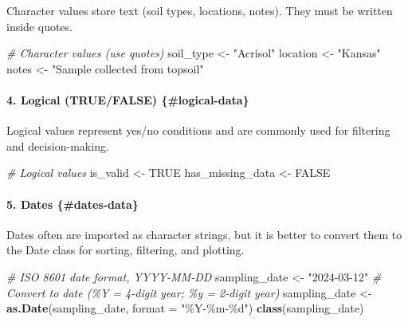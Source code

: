 \documentclass[
  10pt,
  b5paper,
  oneside]{book}
\newenvironment{Shaded}{\begin{snugshade}}{\end{snugshade}}
\newcommand{\AttributeTok}[1]{\textcolor[rgb]{0.13,0.29,0.53}{#1}}
\newcommand{\CommentTok}[1]{\textcolor[rgb]{0.56,0.35,0.01}{\textit{#1}}}
\newcommand{\ConstantTok}[1]{\textcolor[rgb]{0.56,0.35,0.01}{#1}}
\newcommand{\FunctionTok}[1]{\textcolor[rgb]{0.13,0.29,0.53}{\textbf{#1}}}
\newcommand{\NormalTok}[1]{#1}
\newcommand{\OtherTok}[1]{\textcolor[rgb]{0.56,0.35,0.01}{#1}}
\newcommand{\StringTok}[1]{\textcolor[rgb]{0.31,0.60,0.02}{#1}}
\begin{document}
Character values store text (soil types, locations, notes). They must be written inside quotes.

\begin{Shaded}
\begin{Highlighting}[]
\CommentTok{\# Character values (use quotes)}
\NormalTok{soil\_type }\OtherTok{\textless{}{-}} \StringTok{"Acrisol"}
\NormalTok{location }\OtherTok{\textless{}{-}} \StringTok{"Kansas"}
\NormalTok{notes }\OtherTok{\textless{}{-}} \StringTok{"Sample collected from topsoil"}
\end{Highlighting}
\end{Shaded}

\paragraph*{4. Logical (TRUE/FALSE) \{\#logical-data\}}\label{logical-truefalse-logical-data}

Logical values represent yes/no conditions and are commonly used for filtering and decision-making.

\begin{Shaded}
\begin{Highlighting}[]
\CommentTok{\# Logical values}
\NormalTok{is\_valid }\OtherTok{\textless{}{-}} \ConstantTok{TRUE}
\NormalTok{has\_missing\_data }\OtherTok{\textless{}{-}} \ConstantTok{FALSE}
\end{Highlighting}
\end{Shaded}

\paragraph*{5. Dates \{\#dates-data\}}\label{dates-dates-data}

Dates often are imported as character strings, but it is better to convert them to the Date class for sorting, filtering, and plotting.

\begin{Shaded}
\begin{Highlighting}[]
\CommentTok{\# ISO 8601 date format, YYYY{-}MM{-}DD}
\NormalTok{sampling\_date }\OtherTok{\textless{}{-}} \StringTok{"2024{-}03{-}12"}
\CommentTok{\# Convert to date (\%Y = 4{-}digit year; \%y = 2{-}digit year)}
\NormalTok{sampling\_date }\OtherTok{\textless{}{-}} \FunctionTok{as.Date}\NormalTok{(sampling\_date, }\AttributeTok{format =} \StringTok{"\%Y{-}\%m{-}\%d"}\NormalTok{)}
\FunctionTok{class}\NormalTok{(sampling\_date)}
\end{Highlighting}
\end{Shaded}
\end{document}
